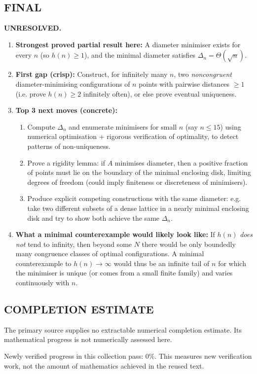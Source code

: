\subsection*{FINAL}
\textbf{UNRESOLVED.}
\begin{enumerate}[label=(\roman*),leftmargin=2.5em]
\item \textbf{Strongest proved partial result here:}
A diameter minimiser exists for every $n$ (so $h(n)\ge 1$), and the minimal diameter satisfies $\Delta_n=\Theta(\sqrt{n})$.
\item \textbf{First gap (crisp):}
Construct, for infinitely many $n$, two \emph{noncongruent} diameter-minimising configurations of $n$ points with pairwise distances $\ge 1$ (i.e. prove $h(n)\ge 2$ infinitely often), or else prove eventual uniqueness.
\item \textbf{Top 3 next moves (concrete):}
\begin{enumerate}[label=(\alph*),leftmargin=2.5em]
\item Compute $\Delta_n$ and enumerate minimisers for small $n$ (say $n\le 15$) using numerical optimisation + rigorous verification of optimality, to detect patterns of non-uniqueness.
\item Prove a rigidity lemma: if $A$ minimises diameter, then a positive fraction of points must lie on the boundary of the minimal enclosing disk, limiting degrees of freedom (could imply finiteness or discreteness of minimisers).
\item Produce explicit competing constructions with the same diameter: e.g. take two different subsets of a dense lattice in a nearly minimal enclosing disk and try to show both achieve the same $\Delta_n$.
\end{enumerate}
\item \textbf{What a minimal counterexample would likely look like:}
If $h(n)$ \emph{does not} tend to infinity, then beyond some $N$ there would be only boundedly many congruence classes of optimal configurations. A minimal counterexample to $h(n)\to\infty$ would thus be an infinite tail of $n$ for which the minimiser is unique (or comes from a small finite family) and varies continuously with $n$.
\end{enumerate}



\subsection*{COMPLETION ESTIMATE}
The primary source supplies no extractable numerical completion estimate. Its mathematical progress is not numerically assessed here.

Newly verified progress in this collection pass: $0\%$. This measures new verification work, not the amount of mathematics achieved in the reused text.
